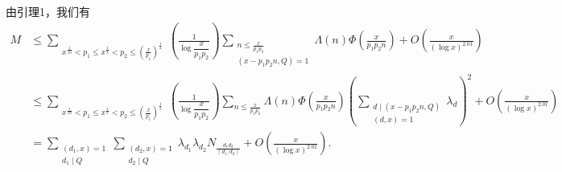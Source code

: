 由引理1，我们有
\begin{align*}
M&\leqslant\sum_{\substack{x^{\frac1{10}}<p_1\leqslant x^{\frac13}<p_2\leqslant(\frac{x}{p_1})^{\frac12}}}
\left(\frac{1}{\log\dfrac{x}{p_1p_2}}\right)
\sum_{\substack{n\leqslant\frac{x}{p_1p_2}\\(x-p_1p_2n,Q)=1}}
\Lambda(n)\Phi\left(\frac{x}{p_1p_2n}\right)
+O\left(\frac{x}{(\log x)^{2.01}}\right)\\
&\leqslant\sum_{\substack{x^{\frac1{10}}<p_1\leqslant x^{\frac13}<p_2\leqslant(\frac{x}{p_1})^{\frac12}}}
\left(\frac{1}{\log\dfrac{x}{p_1p_2}}\right)
\sum_{n\leqslant\frac{x}{p_1p_2}}
\Lambda(n)\Phi\left(\frac{x}{p_1p_2n}\right)
\left(\sum_{\substack{d\mid(x-p_1p_2n,Q)\\(d,x)=1}}\lambda_d\right)^2
+O\left(\frac{x}{(\log x)^{2.01}}\right)\\
&=\sum_{\substack{(d_1,x)=1\\d_1\mid Q}}
\sum_{\substack{(d_2,x)=1\\d_2\mid Q}}
\lambda_{d_1}\lambda_{d_2}
N_{\frac{d_1d_2}{(d_1,d_2)}}
+O\left(\frac{x}{(\log x)^{2.01}}\right).\tag{5}
\end{align*}

